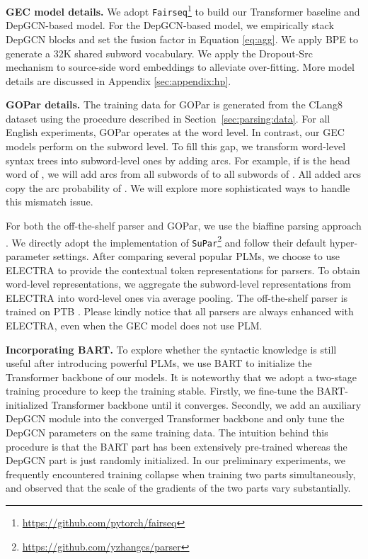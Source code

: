 \documentclass[11pt]{article}
\begin{document}
\textbf{GEC model details.}
We adopt \texttt{Fairseq}\footnote{\url{https://github.com/pytorch/fairseq}} \citep{ott2019fairseq} to build our Transformer baseline and DepGCN-based model. 
For the DepGCN-based model, we empirically stack  DepGCN blocks and set the fusion factor  in Equation \ref{eq:agg}. 
We apply BPE \citep{sennrich-etal-2016-neural} to generate a 32K shared subword vocabulary. 
We apply the Dropout-Src mechanism \cite{junczys2018approaching} to source-side word embeddings  
to alleviate over-fitting. 
More model details are discussed in Appendix \ref{sec:appendix:hp}.


\textbf{GOPar details.} 
The training data for GOPar is generated from the CLang8 dataset \citep{rothe2021recipe} using the procedure described in Section~\ref{sec:parsing:data}. 
For all English experiments, GOPar operates at the word level. 
In contrast, our GEC models perform on the subword level. To fill this gap, we transform word-level syntax trees into subword-level ones by adding arcs. For example, if  is the head word of , we will 
add arcs from all subwords of  to all subwords of . All added arcs copy the arc probability of . We will explore more sophisticated ways to handle this mismatch  issue. 



For both the off-the-shelf parser and GOPar, we use the biaffine parsing approach \citep{DBLP:conf/iclr/DozatM17}.
We directly adopt the implementation of  \texttt{SuPar}\footnote{\url{https://github.com/yzhangcs/parser}} \citep{DBLP:conf/acl/ZhangLZ20} and follow their default hyper-parameter settings. 
After comparing several popular PLMs, 
we choose to use 
ELECTRA \citep{DBLP:conf/iclr/ClarkLLM20} to provide the contextual token representations for parsers. 
To obtain word-level representations, we aggregate the subword-level representations from ELECTRA into word-level ones via average pooling. 
The off-the-shelf parser is trained on PTB \cite{marcinkiewicz1994building}. 
Please kindly notice that all parsers are always enhanced with ELECTRA, even when the GEC model does not use PLM.  




\textbf{Incorporating BART.} 
To explore whether the syntactic knowledge is still useful after introducing powerful PLMs, we use BART \citep{lewis2020bart} to initialize the Transformer backbone of our models.
It is noteworthy that we adopt a two-stage training procedure to keep the training stable. Firstly, we fine-tune the BART-initialized Transformer backbone until it converges. Secondly, we add an auxiliary DepGCN module into the converged Transformer backbone and only tune the DepGCN parameters on the same training data. The intuition behind this procedure is that the BART part has been extensively pre-trained whereas the DepGCN part is just randomly initialized. In our preliminary experiments, we frequently encountered training collapse when training two parts simultaneously, and observed that the scale of the gradients of the two parts vary substantially.
\end{document}
